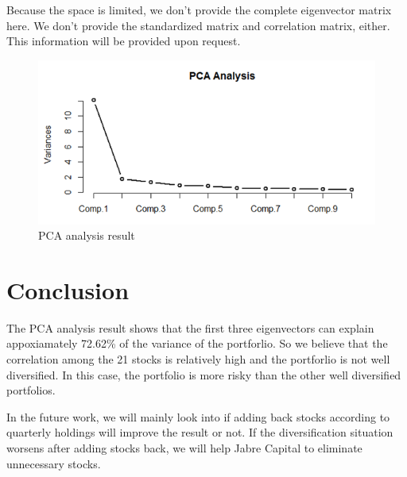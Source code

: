 \documentclass[oneside,12pt]{report}
\begin{document}
Because the space is limited, we don't provide the complete eigenvector matrix here. We don't provide the standardized matrix and correlation matrix, either. This information will be provided upon request.
\begin{figure}[ht]
    \begin{center}
        \includegraphics[width=\textwidth]{5.png}
    \end{center}
    \caption{PCA analysis result}
    \label{fig:eigenvector}
\end{figure}


\chapter{Conclusion}\label{Conclusion}
The PCA analysis result shows that the first three eigenvectors can explain appoxiamately 72.62\% of the variance of the portforlio. So we believe that the correlation among the 21 stocks is relatively high and the portforlio is not well diversified. In this case, the portfolio is more risky than the other well diversified portfolios. 

In the future work, we will mainly look into if adding back stocks according to quarterly holdings will improve the result or not. If the diversification situation worsens after adding stocks back, we will help Jabre Capital to eliminate unnecessary stocks. 

%
%
%
%
%
%


\appendix
{}

\end{document}
